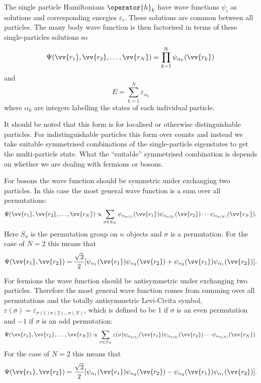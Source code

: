 \documentclass[fleqn]{NotesClass}
\begin{document}
    The single particle Hamiltonians \(\operator{h}_k\) have wave functions \(\psi_i\) as solutions and corresponding energies \(\varepsilon_i\).
    These solutions are common between all particles.
    The many body wave function is then factorised in terms of these single-particles solutions so
    \begin{equation}
        \Psi(\vv{r_1}, \vv{r_2}, \dotsc, \vv{r_N}) = \prod_{k = 1}^{N} \psi_{\alpha_k} (\vv{r_k})
    \end{equation}
    and
    \begin{equation}
        E = \sum_{k = 1}^{N} \varepsilon_{\alpha_k}
    \end{equation}
    where \(\alpha_k\) are integers labelling the states of each individual particle.
    
    It should be noted that this form is for localised or otherwise distinguishable particles.
    For indistinguishable particles this form over counts and instead we take suitable symmetrised combinations of the single-particle eigenstates to get the multi-particle state.
    What the \enquote{suitable} symmetrised combination is depends on whether we are dealing with fermions or bosons.
    
    For bosons the wave function should be symmetric under exchanging two particles.
    In this case the most general wave function is a sum over all permutations:
    \begin{equation}
        \Psi(\vv{r_1}, \vv{r_2}, \dotsc, \vv{r_N}) \propto \sum_{\sigma \in S_N} \psi_{\alpha_{\sigma(1)}} (\vv{r_1}) \psi_{\alpha_{\sigma(2)}}(\vv{r_2}) \dotsm \psi_{\alpha_{\sigma(N)}} (\vv{r_N}).
    \end{equation}
    Here \(S_n\) is the permutation group on \(n\) objects and \(\sigma\) is a permutation.
    For the case of \(N = 2\) this means that
    \begin{equation}
        \Psi(\vv{r_1}, \vv{r_2}) = \frac{\sqrt{2}}{2}[\psi_{\alpha_1}(\vv{r_1})\psi_{\alpha_2}(\vv{r_2}) + \psi_{\alpha_2}(\vv{r_1})\psi_{\alpha_1}(\vv{r_2})].
    \end{equation}
    
    For fermions the wave function should be antisymmetric under exchanging two particles.
    Therefore the most general wave function comes from summing over all permutations and the totally antisymmetric Levi-Civita symbol, \(\varepsilon(\sigma) = \varepsilon_{\sigma(1)\sigma(2)\dotso\sigma(N)}\), which is defined to be 1 if \(\sigma\) is an even permutation and \(-1\) if \(\sigma\) is an odd permutation:
    \begin{equation}
        \Psi(\vv{r_1}, \vv{r_2}, \dotsc, \vv{r_N}) \propto \sum_{\sigma \in S_N} \varepsilon(\sigma)\psi_{\alpha_{\sigma(1)}}(\vv{r_1}) \psi_{\alpha_{\sigma(2)}}(\vv{r_2}) \dotsm \psi_{\alpha_{\sigma(N)}}(\vv{r_N}).
    \end{equation}
    For the case of \(N = 2\) this means that
    \begin{equation}
        \Psi(\vv{r_1}, \vv{r_2}) = \frac{\sqrt{2}}{2} [\psi_{\alpha_1}(\vv{r_1})\psi_{\alpha_2}(\vv{r_2}) - \psi_{\alpha_2}(\vv{r_1})\psi_{\alpha_1}(\vv{r_2})].
    \end{equation}
    
\end{document}
